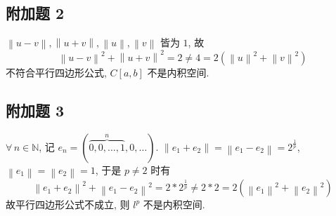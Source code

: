 \documentclass[../main.tex]{subfiles}
\begin{document}
\subsection{附加题 2}
$\left\| u - v \right\|, \left\| u + v \right\|, \left\| u \right\|, \left\| v \right\|$ 皆为 $1$, 故
\[
    \left\| u - v \right\|^2 + \left\| u + v \right\|^2
    = 2
    \neq 4
    = 2 \left( \left\| u \right\|^2 + \left\| v \right\|^2 \right)
\]
不符合平行四边形公式, $C \left[ a, b \right]$ 不是内积空间.

\subsection{附加题 3}
$\forall \, n \in \mathbb{N}$, 记 $e_n = ( \overbrace{0, 0, \dots , 1}^n , 0, \dots)$.
$\left\| e_1 + e_2 \right\| = \left\| e_1 - e_2 \right\| = 2^{\frac{1}{p}}$, $\left\| e_1 \right\| = \left\| e_2 \right\| = 1$,
于是 $p \neq 2$ 时有
\[
    \left\| e_1 + e_2 \right\|^2 + \left\| e_1 - e_2 \right\|^2
    = 2 * 2^{\frac{1}{p}}
    \neq 2 * 2
    = 2 \left( \left\| e_1 \right\|^2 + \left\| e_2 \right\|^2 \right)
\]
故平行四边形公式不成立, 则 $l^p$ 不是内积空间.
\end{document}
